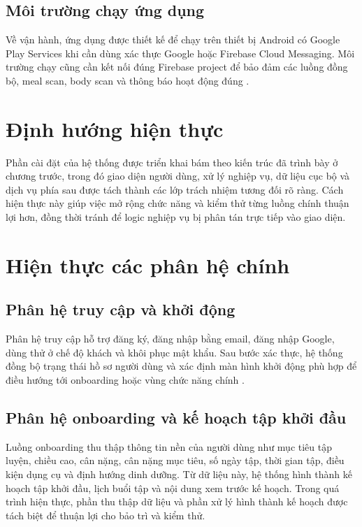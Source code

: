 \subsection{Môi trường chạy ứng dụng}

Về vận hành, ứng dụng được thiết kế để chạy trên thiết bị Android có Google Play Services khi cần dùng xác thực Google hoặc Firebase Cloud Messaging. Môi trường chạy cũng cần kết nối đúng Firebase project để bảo đảm các luồng đồng bộ, meal scan, body scan và thông báo hoạt động đúng \cite{firebase_auth,firebase_fcm}.

\section{Định hướng hiện thực}

Phần cài đặt của hệ thống được triển khai bám theo kiến trúc đã trình bày ở chương trước, trong đó giao diện người dùng, xử lý nghiệp vụ, dữ liệu cục bộ và dịch vụ phía sau được tách thành các lớp trách nhiệm tương đối rõ ràng. Cách hiện thực này giúp việc mở rộng chức năng và kiểm thử từng luồng chính thuận lợi hơn, đồng thời tránh để logic nghiệp vụ bị phân tán trực tiếp vào giao diện.

\section{Hiện thực các phân hệ chính}

\subsection{Phân hệ truy cập và khởi động}

Phân hệ truy cập hỗ trợ đăng ký, đăng nhập bằng email, đăng nhập Google, dùng thử ở chế độ khách và khôi phục mật khẩu. Sau bước xác thực, hệ thống đồng bộ trạng thái hồ sơ người dùng và xác định màn hình khởi động phù hợp để điều hướng tới onboarding hoặc vùng chức năng chính \cite{firebase_auth,firebase_firestore}.

\subsection{Phân hệ onboarding và kế hoạch tập khởi đầu}

Luồng onboarding thu thập thông tin nền của người dùng như mục tiêu tập luyện, chiều cao, cân nặng, cân nặng mục tiêu, số ngày tập, thời gian tập, điều kiện dụng cụ và định hướng dinh dưỡng. Từ dữ liệu này, hệ thống hình thành kế hoạch tập khởi đầu, lịch buổi tập và nội dung xem trước kế hoạch. Trong quá trình hiện thực, phần thu thập dữ liệu và phần xử lý hình thành kế hoạch được tách biệt để thuận lợi cho bảo trì và kiểm thử.


